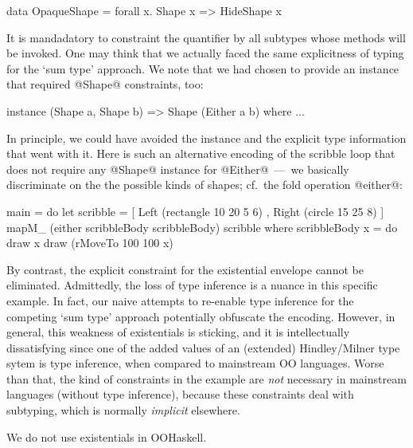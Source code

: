\documentclass{jfp}
\begin{document}
\begin{code}
 data OpaqueShape = forall x. Shape x => HideShape x
\end{code}

It is mandadatory to constraint the quantifier by all subtypes whose
methods will be invoked. One may think that we actually faced the same
explicitness of typing for the `sum type' approach. We note that we
had chosen to provide an instance that required @Shape@ constraints,
too:

\begin{code}
 instance (Shape a, Shape b) => Shape (Either a b) where ...	
\end{code}

In principle, we could have avoided the instance and the explicit type
information that went with it. Here is such an alternative encoding of
the scribble loop that does not require any @Shape@ instance for
@Either@~---~we basically discriminate on the the possible kinds of
shapes; cf.\ the fold operation @either@:

\begin{code}
 main =
      do
         let scribble = [ Left  (rectangle 10 20 5 6)
                        , Right (circle 15 25 8)
                        ]
         mapM_ (either scribbleBody scribbleBody) scribble
 where
   scribbleBody x = do
                   draw x
                   draw (rMoveTo 100 100 x) 
\end{code}

By contrast, the explicit constraint for the existential envelope
cannot be eliminated.  Admittedly, the loss of type inference is a
nuance in this specific example. In fact, our naive attempts to
re-enable type inference for the competing `sum type' approach
potentially obfuscate the encoding. However, in general, this weakness
of existentials is sticking, and it is intellectually dissatisfying
since one of the added values of an (extended) Hindley/Milner type
sytem is type inference, when compared to mainstream OO
languages. Worse than that, the kind of constraints in the example are
\emph{not} necessary in mainstream languages (without type inference),
because these constraints deal with subtyping, which is normally
\emph{implicit} elsewhere.

We do not use existentials in OOHaskell.



\end{document}
